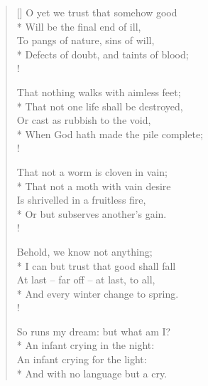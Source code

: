 \documentclass[MAIN]{subfiles}
\begin{document}
\settowidth{\versewidth}{The chestnut pattering to the ground:}
\begin{verse}[\versewidth]
O yet we trust that somehow good\\*
\vin Will be the final end of ill,\\
\vin To pangs of nature, sins of will,\\*
Defects of doubt, and taints of blood;\\!

That nothing walks with aimless feet;\\*
\vin That not one life shall be destroyed,\\
\vin Or cast as rubbish to the void,\\*
When God hath made the pile complete;\\!

That not a worm is cloven in vain;\\*
\vin That not a moth with vain desire\\
\vin Is shrivelled in a fruitless fire,\\*
Or but subserves another's gain.\\!

Behold, we know not anything;\\*
\vin I can but trust that good shall fall\\
\vin At last -- far off -- at last, to all,\\*
And every winter change to spring.\\!

So runs my dream: but what am I?\\*
\vin An infant crying in the night:\\
\vin An infant crying for the light:\\*
And with no language but a cry.
\end{verse}
\end{document}
